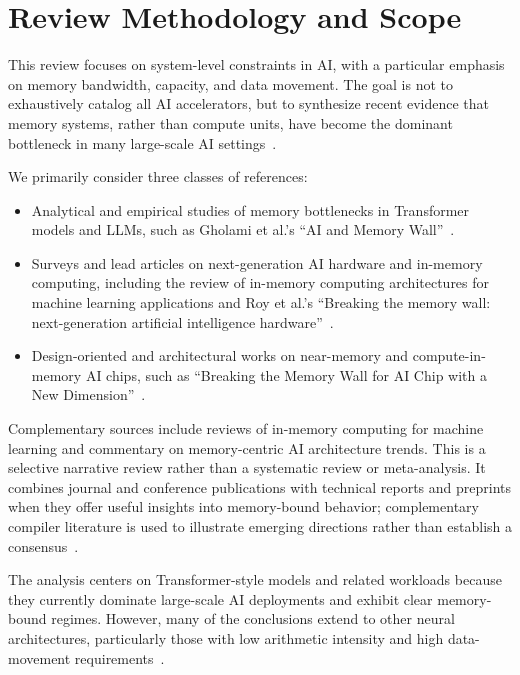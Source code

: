 \documentclass[conference]{IEEEtran}
\begin{document}
\section{Review Methodology and Scope}
\label{sec:methodology}

This review focuses on system-level constraints in AI, with a particular emphasis on memory bandwidth, capacity, and data movement. The goal is not to exhaustively catalog all AI accelerators, but to synthesize recent evidence that memory systems, rather than compute units, have become the dominant bottleneck in many large-scale AI settings~\cite{gholami2024ai}.

We primarily consider three classes of references:
\begin{itemize}
    \item Analytical and empirical studies of memory bottlenecks in Transformer models and LLMs, such as Gholami et al.'s ``AI and Memory Wall''~\cite{gholami2024ai}.
    \item Surveys and lead articles on next-generation AI hardware and in-memory computing, including the review of in-memory computing architectures for machine learning applications and Roy et al.'s ``Breaking the memory wall: next-generation artificial intelligence hardware''~\cite{bavikadi2020review,roy2025breaking}.
    \item Design-oriented and architectural works on near-memory and compute-in-memory AI chips, such as ``Breaking the Memory Wall for AI Chip with a New Dimension''~\cite{sunrise2020}.
\end{itemize}

Complementary sources include reviews of in-memory computing for machine learning and commentary on memory-centric AI architecture trends. This is a selective narrative review rather than a systematic review or meta-analysis. It combines journal and conference publications with technical reports and preprints when they offer useful insights into memory-bound behavior; complementary compiler literature is used to illustrate emerging directions rather than establish a consensus~\cite{snasel2024review,mittal2021survey,wang2014memory,charlotte2024compiler}.

The analysis centers on Transformer-style models and related workloads because they currently dominate large-scale AI deployments and exhibit clear memory-bound regimes. However, many of the conclusions extend to other neural architectures, particularly those with low arithmetic intensity and high data-movement requirements~\cite{bavikadi2020review,roy2025breaking,gholami2024ai}.
\end{document}
